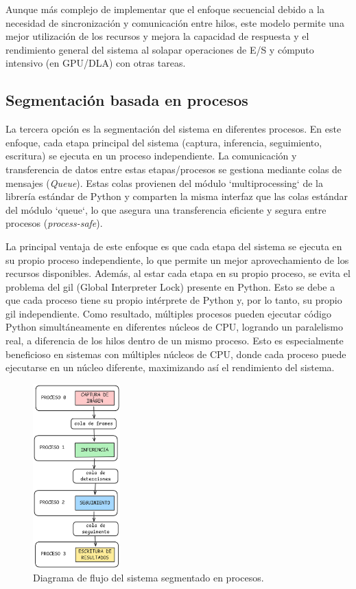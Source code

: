 \documentclass[11pt,spanish,listoffigures,listoftables]{tfgetsinf}
\begin{document}
Aunque más complejo de implementar que el enfoque secuencial debido a la necesidad de sincronización y comunicación entre hilos, este modelo permite una mejor utilización de los recursos y mejora la capacidad de respuesta y el rendimiento general del sistema al solapar operaciones de E/S y cómputo intensivo (en GPU/DLA) con otras tareas.

\subsection{Segmentación basada en procesos} \label{sub:segmentacion_procesos}

La tercera opción es la segmentación del sistema en diferentes procesos. En este enfoque, cada etapa principal del sistema (captura, inferencia, seguimiento, escritura) se ejecuta en un proceso independiente. La comunicación y transferencia de datos entre estas etapas/procesos se gestiona mediante colas de mensajes (\textit{Queue}). Estas colas provienen del módulo `multiprocessing` de la librería estándar de Python y comparten la misma interfaz que las colas estándar del módulo `queue`, lo que asegura una transferencia eficiente y segura entre procesos (\textit{process-safe}).

La principal ventaja de este enfoque es que cada etapa del sistema se ejecuta en su propio proceso independiente, lo que permite un mejor aprovechamiento de los recursos disponibles. Además, al estar cada etapa en su propio proceso, se evita el problema del \gls{gil} (Global Interpreter Lock) presente en Python. Esto se debe a que cada proceso tiene su propio intérprete de Python y, por lo tanto, su propio \gls{gil} independiente. Como resultado, múltiples procesos pueden ejecutar código Python simultáneamente en diferentes núcleos de CPU, logrando un paralelismo real, a diferencia de los hilos dentro de un mismo proceso. Esto es especialmente beneficioso en sistemas con múltiples núcleos de CPU, donde cada proceso puede ejecutarse en un núcleo diferente, maximizando así el rendimiento del sistema.

\begin{figure}[H]
   \centering
   \includegraphics[width=0.3\textwidth]{images/diseno_e_implementacion/segmentacion_procesos.png}
   \caption{Diagrama de flujo del sistema segmentado en procesos.}
   \label{fig:procesos}
\end{figure}
\end{document}
